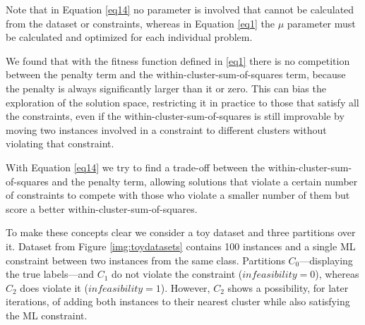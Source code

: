 \documentclass[review]{elsarticle}
\begin{document}
Note that in Equation \eqref{eq14} no parameter is involved that cannot be calculated from the dataset or constraints, whereas in Equation \eqref{eq1} the $\mu$ parameter must be calculated and optimized for each individual problem.

We found that with the fitness function defined in \eqref{eq1} there is no competition between the penalty term and the within-cluster-sum-of-squares term, because the penalty is always significantly larger than it or zero. This can bias the exploration of the solution space, restricting it in practice to those that satisfy all the constraints, even if the within-cluster-sum-of-squares is still improvable by moving two instances involved in a constraint to different clusters without violating that constraint.

With Equation \eqref{eq14} we try to find a trade-off between the within-cluster-sum-of-squares and the penalty term, allowing solutions that violate a certain number of constraints to compete with those who violate a smaller number of them but score a better within-cluster-sum-of-squares.

To make these concepts clear we consider a toy dataset and three partitions over it. Dataset from Figure \ref{img:toydatasets} contains 100 instances and a single ML constraint between two instances from the same class. Partitions $C_0$---displaying the true labels---and $C_1$ do not violate the constraint ($infeasibility = 0$), whereas $C_2$ does violate it ($infeasibility = 1$). However, $C_2$ shows a possibility, for later iterations, of adding both instances to their nearest cluster while also satisfying the ML constraint.
\end{document}
